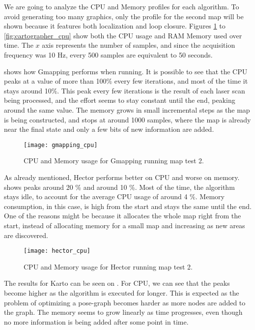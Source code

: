 We are going to analyze the CPU and Memory profiles for each algorithm. To avoid generating too many graphics, only the profile for the second map will be shown because it features both localization and loop closure. Figures \ref{fig:gmapping_cpu} to \ref{fig:cartographer_cpu} show both the CPU usage and RAM Memory used over time. The $x$ axis represents the number of samples, and since the acquisition frequency was 10 Hz, every 500 samples are equivalent to 50 seconds.

 shows how Gmapping performs when running. It is possible to see that the CPU peaks at a value of more than 100\% every few iterations, and most of the time it stays around 10\%. This peak every few iterations is the result of each laser scan being processed, and the effort seems to stay constant until the end, peaking around the same value. The memory grows in small incremental steps as the map is being constructed, and stops at around 1000 samples, where the map is already near the final state and only a few bits of new information are added.

\begin{figure}[!ht]
    \centering
    \texttt{[image: gmapping\_cpu]}
    \caption{CPU and Memory usage for Gmapping running map test 2.}
    \label{fig:gmapping_cpu}
\end{figure}

As already mentioned, Hector performs better on CPU and worse on memory.  shows peaks around 20 \% and around 10 \%. Most of the time, the algorithm stays idle, to account for the average CPU usage of around 4 \%. Memory consumption, in this case, is high from the start and stays the same until the end. One of the reasons might be because it allocates the whole map right from the start, instead of allocating memory for a small map and increasing as new areas are discovered.

\begin{figure}[!ht]
    \centering
    \texttt{[image: hector\_cpu]}
    \caption{CPU and Memory usage for Hector running map test 2.}
    \label{fig:hector_cpu}
\end{figure}

The results for Karto can be seen on . For CPU, we can see that the peaks become higher as the algorithm is executed for longer. This is expected as the problem of optimizing a pose-graph becomes harder as more nodes are added to the graph. The memory seems to grow linearly as time progresses, even though no more information is being added after some point in time.


